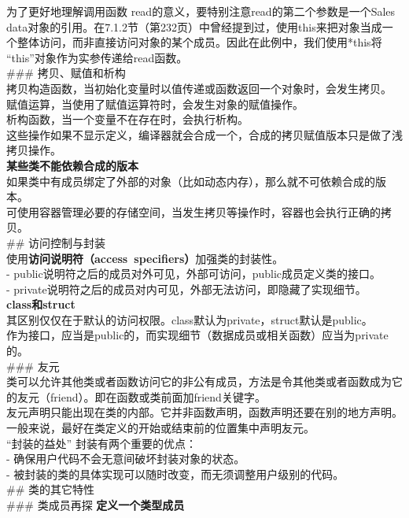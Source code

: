 \documentclass[
  a4paper,
  oneside,tablecaptionabove
]{scrbook}
\begin{document}
为了更好地理解调用函数 read的意义，要特别注意read的第二个参数是一个Sales
data对象的引用。在7.1.2节（第232页）中曾经提到过，使用this来把对象当成一个整体访问，而非直接访问对象的某个成员。因此在此例中，我们使用*this将
\enquote{this}对象作为实参传递给read函数。\\
\#\#\# 拷贝、赋值和析构\\
拷贝构造函数，当初始化变量时以值传递或函数返回一个对象时，会发生拷贝。\\
赋值运算，当使用了赋值运算符时，会发生对象的赋值操作。\\
析构函数，当一个变量不在存在时，会执行析构。\\
这些操作如果不显示定义，编译器就会合成一个，合成的拷贝赋值版本只是做了浅拷贝操作。\\
\textbf{某些类不能依赖合成的版本}\\
如果类中有成员绑定了外部的对象（比如动态内存），那么就不可依赖合成的版本。\\
可使用容器管理必要的存储空间，当发生拷贝等操作时，容器也会执行正确的拷贝。\\
\#\# 访问控制与封装\\
使用\textbf{访问说明符（access~specifiers）}加强类的封装性。\\
- public说明符之后的成员对外可见，外部可访问，public成员定义类的接口。\\
- private说明符之后的成员对内可见，外部无法访问，即隐藏了实现细节。\\
\textbf{class和struct}\\
其区别仅仅在于默认的访问权限。class默认为private，struct默认是public。\\
作为接口，应当是public的，而实现细节（数据成员或相关函数）应当为private的。\\
\#\#\# 友元\\
类可以允许其他类或者函数访问它的非公有成员，方法是令其他类或者函数成为它的友元（friend）。即在函数或类前面加friend关键字。\\
友元声明只能出现在类的内部。它并非函数声明，函数声明还要在别的地方声明。\\
一般来说，最好在类定义的开始或结束前的位置集中声明友元。\\
\enquote{封装的益处} 封装有两个重要的优点：\\
- 确保用户代码不会无意间破坏封装对象的状态。\\
- 被封装的类的具体实现可以随时改变，而无须调整用户级别的代码。\\
\#\# 类的其它特性\\
\#\#\# 类成员再探 \textbf{定义一个类型成员}\\
\end{document}
